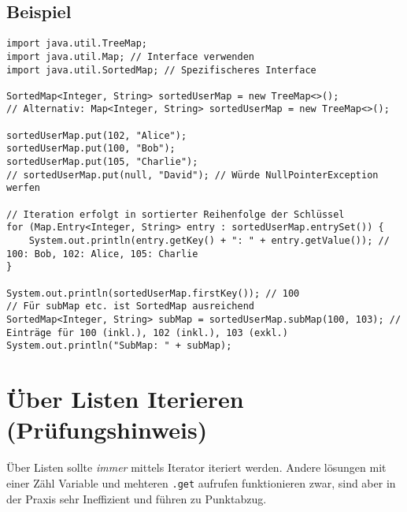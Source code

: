 \subsection{Beispiel}
\begin{lstlisting}[caption={Beispiel für die Verwendung einer TreeMap in Java}, label=lst:treeMapExample]
import java.util.TreeMap;
import java.util.Map; // Interface verwenden
import java.util.SortedMap; // Spezifischeres Interface

SortedMap<Integer, String> sortedUserMap = new TreeMap<>();
// Alternativ: Map<Integer, String> sortedUserMap = new TreeMap<>();

sortedUserMap.put(102, "Alice");
sortedUserMap.put(100, "Bob");
sortedUserMap.put(105, "Charlie");
// sortedUserMap.put(null, "David"); // Würde NullPointerException werfen

// Iteration erfolgt in sortierter Reihenfolge der Schlüssel
for (Map.Entry<Integer, String> entry : sortedUserMap.entrySet()) {
    System.out.println(entry.getKey() + ": " + entry.getValue()); // 100: Bob, 102: Alice, 105: Charlie
}

System.out.println(sortedUserMap.firstKey()); // 100
// Für subMap etc. ist SortedMap ausreichend
SortedMap<Integer, String> subMap = sortedUserMap.subMap(100, 103); // Einträge für 100 (inkl.), 102 (inkl.), 103 (exkl.)
System.out.println("SubMap: " + subMap);
\end{lstlisting}

\section{Über Listen Iterieren (Prüfungshinweis)}
Über Listen sollte \textit{immer} mittels Iterator iteriert werden. Andere lösungen mit einer Zähl Variable und mehteren \lstinline{.get} aufrufen funktionieren zwar, sind aber in der Praxis sehr Ineffizient und führen zu Punktabzug.